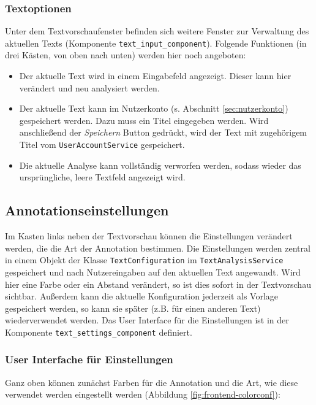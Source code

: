 \subsubsection{Textoptionen}

Unter dem Textvorschaufenster befinden sich weitere Fenster zur Verwaltung des aktuellen Texts (Komponente \texttt{text\_input\_component}). Folgende Funktionen (in drei Kästen, von oben nach unten) werden hier noch angeboten:
\begin{itemize}
	\item Der aktuelle Text wird in einem Eingabefeld angezeigt. Dieser kann hier verändert und neu analysiert werden.
	\item Der aktuelle Text kann im Nutzerkonto (s. Abschnitt \ref{sec:nutzerkonto}) gespeichert werden. Dazu muss ein Titel eingegeben werden. Wird anschließend der \textit{Speichern} Button gedrückt, wird der Text mit zugehörigem Titel vom \texttt{UserAccountService} gespeichert.
	\item Die aktuelle Analyse kann vollständig verworfen werden, sodass wieder das ursprüngliche, leere Textfeld angezeigt wird.
\end{itemize}

\subsection{Annotationseinstellungen}

Im Kasten links neben der Textvorschau können die Einstellungen verändert werden, die die Art der Annotation bestimmen. Die Einstellungen werden zentral in einem Objekt der Klasse \texttt{TextConfiguration} im \texttt{TextAnalysisService} gespeichert und nach Nutzereingaben auf den aktuellen Text angewandt. Wird hier eine Farbe oder ein Abstand verändert, so ist dies sofort in der Textvorschau sichtbar. Außerdem kann die aktuelle Konfiguration jederzeit als Vorlage gespeichert werden, so kann sie später (z.B. für einen anderen Text) wiederverwendet werden. Das User Interface für die Einstellungen ist in der Komponente \texttt{text\_settings\_component} definiert.

\subsubsection{User Interfache für Einstellungen}

Ganz oben können zunächst Farben für die Annotation und die Art, wie diese verwendet werden eingestellt werden (Abbildung \ref{fig:frontend-colorconf}):

